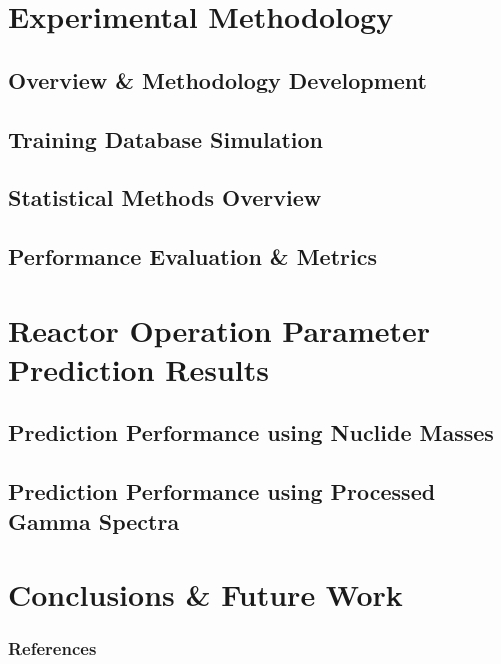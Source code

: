 \documentclass[10pt]{beamer}
\begin{document}
\section{Experimental Methodology}
\subsection{Overview \& Methodology Development}

\subsection{Training Database Simulation}

\subsection{Statistical Methods Overview}

\subsection{Performance Evaluation \& Metrics}


\section{Reactor Operation Parameter Prediction Results}
\subsection{Prediction Performance using Nuclide Masses}

\subsection{Prediction Performance using Processed Gamma Spectra}


\section{Conclusions \& Future Work}




\begin{frame}[allowframebreaks]
  \frametitle{References}
  
  {\footnotesize  }
\end{frame}

\end{document}

